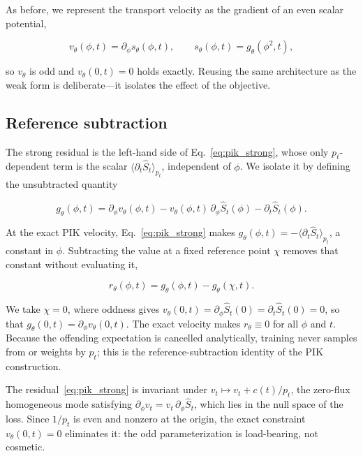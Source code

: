 \documentclass[reprint,twocolumn,superscriptaddress,preprintnumbers,amsmath,amssymb,aps,prd,floatfix]{revtex4-2}
\begin{document}
As before, we represent the transport velocity as the gradient of an even scalar
potential,

\begin{equation}
 v_\theta(\phi,t)=\partial_\phi s_\theta(\phi,t),
 \qquad
 s_\theta(\phi,t)=g_\theta(\phi^2,t),
 \label{eq:potential_velocity}
\end{equation}

so $v_\theta$ is odd and $v_\theta(0,t)=0$ holds exactly. Reusing the same
architecture as the weak form is deliberate---it isolates the effect of the
objective.

\subsection{Reference subtraction}

The strong residual is the left-hand side of Eq.~\eqref{eq:pik_strong}, whose only
$p_t$-dependent term is the scalar $\langle\partial_t\hat S_t\rangle_{p_t}$,
independent of $\phi$. We isolate it by defining the unsubtracted quantity

\begin{equation}
 g_\theta(\phi,t)
 =
 \partial_\phi v_\theta(\phi,t)
 -
 v_\theta(\phi,t)\,\partial_\phi\hat S_t(\phi)
 -
 \partial_t\hat S_t(\phi).
 \label{eq:strong_g}
\end{equation}

At the exact PIK velocity, Eq.~\eqref{eq:pik_strong} makes
$g_\theta(\phi,t)=-\langle\partial_t\hat S_t\rangle_{p_t}$, a constant in $\phi$.
Subtracting the value at a fixed reference point $\chi$ removes that constant
without evaluating it,

\begin{equation}
 r_\theta(\phi,t)
 =
 g_\theta(\phi,t)-g_\theta(\chi,t).
 \label{eq:strong_reference_residual}
\end{equation}

We take $\chi=0$, where oddness gives
$v_\theta(0,t)=\partial_\phi\hat S_t(0)=\partial_t\hat S_t(0)=0$, so that
$g_\theta(0,t)=\partial_\phi v_\theta(0,t)$. The exact velocity makes
$r_\theta\equiv0$ for all $\phi$ and $t$. Because the offending expectation is
cancelled analytically, training never samples from or weights by $p_t$; this is
the reference-subtraction identity of the PIK construction.

The residual~\eqref{eq:pik_strong} is invariant under
$v_t\mapsto v_t+c(t)/p_t$, the zero-flux homogeneous mode satisfying
$\partial_\phi v_t=v_t\,\partial_\phi\hat S_t$, which lies in the null space of the
loss. Since $1/p_t$ is even and nonzero at the origin, the exact constraint
$v_\theta(0,t)=0$ eliminates it: the odd parameterization is load-bearing, not
cosmetic.
\end{document}
